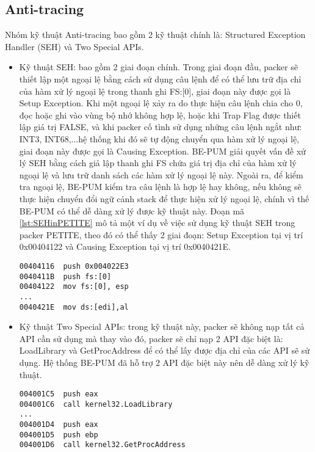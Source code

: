 \subsection{Anti-tracing}
\hspace{0.5cm}Nhóm kỹ thuật Anti-tracing bao gồm 2 kỹ thuật chính là: Structured Exception Handler (SEH) và Two Special APIs.

\begin{itemize}
\item{Kỹ thuật SEH: bao gồm 2 giai đoạn chính. Trong giai đoạn đầu, packer sẽ thiết lập một ngoại lệ bằng cách sử dụng câu lệnh để có thể lưu trữ địa chỉ của hàm xử lý ngoại lệ trong thanh ghi FS:[0], giai đoạn này được gọi là Setup Exception. Khi một ngoại lệ xảy ra do thực hiện câu lệnh chia cho 0, đọc hoặc ghi vào vùng bộ nhớ không hợp lệ, hoặc khi Trap Flag được thiết lập giá trị FALSE, và khi packer cố tình sử dụng những câu lệnh ngắt như: INT3, INT68,...hệ thống khi đó sẽ tự động chuyển qua hàm xử lý ngoại lệ, giai đoạn này được gọi là Causing Exception. BE-PUM giải quyết vấn đề xử lý SEH bằng cách giả lập thanh ghi FS chứa giá trị địa chỉ của hàm xử lý ngoại lệ và lưu trữ danh sách các hàm xử lý ngoại lệ này. Ngoài ra, để kiểm tra ngoại lệ, BE-PUM kiểm tra câu lệnh là hợp lệ hay không, nếu không sẽ thực hiện chuyển đổi ngữ cảnh stack để thực hiện xử lý ngoại lệ, chính vì thế BE-PUM có thể dễ dàng xử lý được kỹ thuật này. Đoạn mã \ref {lst:SEHinPETITE} mô tả một ví dụ về việc sử dụng kỹ thuật SEH trong packer PETITE, theo đó có thể thấy 2 giai đoạn: Setup Exception tại vị trí 0x00404122 và Causing Exception tại vị trí 0x0040421E.
\begin{code}
\begin{lstlisting}[captionpos=b,caption={Kỹ thuật SEH sử dụng trong packer PETITE},label={lst:SEHinPETITE},frame=single]
00404116  push 0x004022E3
0040411B  push fs:[0]
00404122  mov fs:[0], esp
...
0040421E  mov ds:[edi],al
\end{lstlisting}
\end{code}
}
\item{Kỹ thuật Two Special APIs: trong kỹ thuật này, packer sẽ không nạp tất cả API cần sử dụng mà thay vào đó, packer sẽ chỉ nạp 2 API đặc biệt là: LoadLibrary và GetProcAddress để có thể lấy được địa chỉ của các API sẽ sử dụng. Hệ thống BE-PUM đã hỗ trợ 2 API đặc biệt này nên dễ dàng xử lý kỹ thuật.
\begin{lstlisting}[captionpos=b,caption={Kỹ thuật Two Special APIs sử dụng trong packer FSG},label={lst:TwoAPIinFSG},frame=single]
004001C5  push eax
004001C6  call kernel32.LoadLibrary
...
004001D4  push eax
004001D5  push ebp
004001D6  call kernel32.GetProcAddress
\end{lstlisting}
}
\end{itemize}




